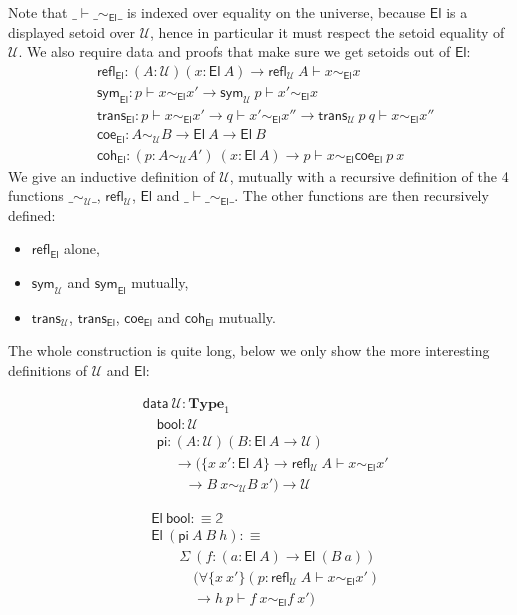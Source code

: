 \documentclass[autoref]{llncs}
\newcommand{\setoidU}{\mathcal{U}}
\newcommand{\mType}{\mathbf{Type}}
\newcommand{\El}{\textsf{El}}
\newcommand{\reflu}{\textsf{refl}_\setoidU}
\newcommand{\symu}{\textsf{sym}_\setoidU}
\newcommand{\transu}{\textsf{trans}_\setoidU}
\newcommand{\coeel}{\textsf{coe}_\El}
\newcommand{\cohel}{\textsf{coh}_\El}
\newcommand{\equ}[2]{#1 \sim_\setoidU #2}
\newcommand{\eqel}[3]{#1 \vdash #2 \sim_\El #3}
\providecommand\mathbbm{\mathbb}
\begin{document}
Note that $\eqel{\_}{\_}{\_}$ is indexed over equality on the universe, because
$\El$ is a displayed setoid over $\setoidU$, hence in particular it must respect the setoid
equality of $\setoidU$.
%
We also require data and proofs that make sure we get setoids out of $\El$:
\begin{align*}
  & \textsf{refl}_\El : (A : \setoidU) (x : \El\ A) \to \eqel{\reflu\ A}{x}{x} \\
  & \textsf{sym}_\El : \eqel{p}{x}{x'} \to \eqel{\symu\ p}{x'}{x} \\
  & \textsf{trans}_\El : \eqel{p}{x}{x'} \to \eqel{q}{x'}{x''} \to \eqel{\transu\ p\ q}{x}{x''} \\
  & \coeel : \equ{A}{B} \to \El\ A \to \El\ B \\
  & \cohel : (p : \equ{A}{A'}) \ (x : \El\ A) \to \eqel{p}{x}{\coeel\ p\ x}
\end{align*}
%
We give an inductive definition of $\setoidU$, mutually with a recursive definition
of the 4 functions
$\_\sim_\setoidU\_$, $\textsf{refl}_\setoidU$, $\El$ and $\_\vdash\_\sim_\El\_$.
The other functions are then recursively defined:
\begin{itemize}
\item $\textsf{refl}_\El$ alone,
\item $\textsf{sym}_\setoidU$ and $\textsf{sym}_\El$ mutually,
\item $\textsf{trans}_\setoidU$, $\textsf{trans}_\El$, $\coeel$ and $\cohel$ mutually.
\end{itemize}
The whole construction is quite long, below we only show the more interesting
definitions of $\setoidU$ and $\El$: \\
\vspace{-0.2em}
\begin{minipage}{0.5\textwidth}
\begin{align*}
  & \textsf{data}\ \setoidU : \mType_1 \\
  & \quad \textsf{bool} : \setoidU \\
  & \quad \textsf{pi}
  :  (A : \setoidU) (B : \El\ A \to \setoidU)\\
  & \ \qquad \to (\{x\ x' : \El\ A\} \to \textsf{refl}_\setoidU\ A \vdash x \sim_\El x'\\
  & \qquad\quad \to B\ x \sim_\setoidU B\ x')
  \to \setoidU
\end{align*}
\end{minipage}
\begin{minipage}{0.5\textwidth}
\begin{align*}
  & \El\ \textsf{bool} :\equiv \mathbbm{2} \\
  & \El\ (\textsf{pi}\ A\ B\ h) :\equiv \\
  & \qquad \Sigma\ (f : (a : \El\ A) \to \El\ (B\ a)) \\
  & \qquad \quad
  (\forall\{x\ x'\}(p : \eqel{\reflu\ A}{x}{x'}) \\
  & \qquad \quad\to \eqel{h\ p}{f\ x}{f\ x'})
\end{align*}
\end{minipage}
\\
\end{document}
